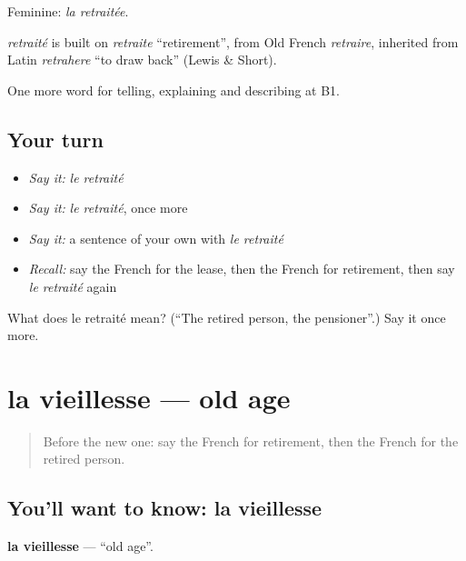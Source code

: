 Feminine: \emph{la retraitée}.

\begin{cousinweb}
\emph{retraité} is built on \emph{retraite} \textquotedblleft{}retirement\textquotedblright{}, from Old French \emph{retraire}, inherited from Latin \emph{retrahere} \textquotedblleft{}to draw back\textquotedblright{} (Lewis \& Short).
\end{cousinweb}

\begin{grammarlens}[title={What you've built}]
One more word for telling, explaining and describing at B1.
\end{grammarlens}

\subsection*{Your turn}
\begin{itemize}
\raggedright
  \item \emph{Say it:} \emph{le retraité}
  \item \emph{Say it:} \emph{le retraité}, once more
  \item \emph{Say it:} a sentence of your own with \emph{le retraité}
  \item \emph{Recall:} say the French for the lease, then the French for retirement, then say \emph{le retraité} again
\end{itemize}

\begin{tcolorbox}[breakable,colback=teal!4,colframe=teal!35!black,title={Before you move on}]
What does le retraité mean? (\textquotedblleft{}The retired person, the pensioner\textquotedblright{}.) Say it once more.
\end{tcolorbox}
\section[la vieillesse]{la vieillesse — old age}

\label{lesson:FR-C313-vieillesse}



\begin{quote}
Before the new one: say the French for retirement, then the French for the retired person.
\end{quote}

\subsection*{You'll want to know: la vieillesse}
\textbf{la vieillesse} — \textquotedblleft{}old age\textquotedblright{}.

